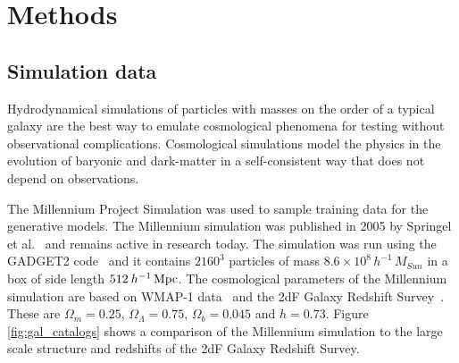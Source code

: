 \documentclass[twocolumn]{article}
\numberwithin{equation}{section}
\begin{document}

\section{Methods}\label{sec:methods}


\subsection{Simulation data}
Hydrodynamical simulations of particles with masses on the order of a typical galaxy are the best way to emulate 
cosmological phenomena for testing without observational complications. Cosmological simulations model the physics in 
the evolution of baryonic and dark-matter in a self-consistent way that does not depend on observations.

The Millennium Project Simulation was used to sample training data for the generative models. The Millennium simulation
was published in 2005 by Springel et al.~\cite{millsim} and remains active in research today. The simulation was run 
using the GADGET2 code~\cite{gadget2} and it contains $2160^3$ particles of mass $8.6 \times 10^8 \, h^{-1}  \, M_{Sun}$ 
in a box of side length $512  \: h^{-1} \,\textup{Mpc}$. The cosmological parameters of the Millennium simulation are 
based on WMAP-1 data~\cite{wmap1} and the 2dF Galaxy Redshift Survey~\cite{2df}. These are $\Omega_m=0.25$, 
$\Omega_{\Lambda}=0.75$, $\Omega_b=0.045$ and $h=0.73$. Figure \ref{fig:gal_catalogs} shows a comparison of the 
Millennium simulation to the large scale structure and redshifts of the 2dF Galaxy Redshift Survey. 
\end{document}
